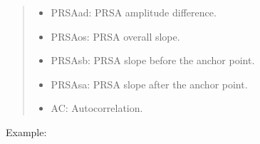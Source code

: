 \documentclass[letterpaper,10pt,english]{sphinxmanual}
\begin{document}
\begin{fulllineitems}
\begin{fulllineitems}
\begin{quote}
\begin{description}
\begin{description}
\begin{itemize}
\item {} 
PRSAad: PRSA amplitude difference.

\item {} 
PRSAos: PRSA overall slope.

\item {} 
PRSAsb: PRSA slope before the anchor point.

\item {} 
PRSAsa: PRSA slope after the anchor point.

\item {} 
AC: Autocorrelation.

\end{itemize}

\end{description}


\end{description}\end{quote}

Example:

\begin{sphinxVerbatim}[commandchars=\\\{\}]
   

   

  
\end{sphinxVerbatim}

\end{fulllineitems}


\end{fulllineitems}

\end{document}
